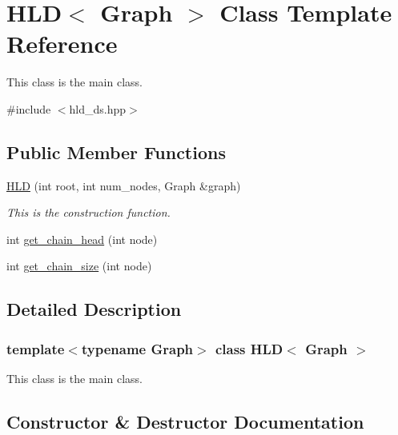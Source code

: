 \hypertarget{classHLD}{}\section{H\+LD$<$ Graph $>$ Class Template Reference}
\label{classHLD}


This class is the main class.  




{\ttfamily \#include $<$hld\+\_\+ds.\+hpp$>$}

\subsection*{Public Member Functions}
\begin{DoxyCompactItemize}
\item 
\hyperlink{classHLD_aeefaffdec17dca33f928fa8e9a2f44d1}{H\+LD} (int root, int num\+\_\+nodes, Graph \&graph)
\begin{DoxyCompactList}\small\item\em This is the construction function. \end{DoxyCompactList}\item 
int \hyperlink{classHLD_a68b3ca2eca7aa9aa6b72b8a6b73e79a9}{get\+\_\+chain\+\_\+head} (int node)
\item 
int \hyperlink{classHLD_a026eff6f1285da4accb3e6e3a3408b85}{get\+\_\+chain\+\_\+size} (int node)
\end{DoxyCompactItemize}


\subsection{Detailed Description}
\subsubsection*{template$<$typename Graph$>$\newline
class H\+L\+D$<$ Graph $>$}

This class is the main class. 

\subsection{Constructor \& Destructor Documentation}
\mbox{\label{classHLD_aeefaffdec17dca33f928fa8e9a2f44d1}} 
